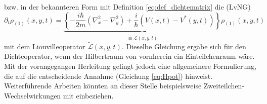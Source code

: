 bzw. in der bekannteren Form mit Definition \eqref{eq:def_dichtematrix} die \lvn (LvNG)
\begin{equation}
  \partial_t \rho_{(1)}(x,y,t) = \underbrace{\left\{-\frac{i\hbar}{2m}(\nabla_x^2 - \nabla_y^2) + \frac{i}{\hbar}(V(x,t) - V^*(y,t)) \right\}}_{\equiv{\tilde{\mathcal{L}}(x,y,t)}} \rho_{(1)}(x,y,t)
  \label{eq:lvn_first}
\end{equation}
mit dem Liouvilleoperator $\tilde{\mathcal{L}}(x,y,t)$. Dieselbe Gleichung ergäbe sich für den Dichteoperator, wenn der Hilbertraum von vornherein ein Einteilchenraum wäre. Mit der vorangegangen Herleitung gelingt jedoch eine allgemeinere Formulierung, die auf die entscheidende Annahme (Gleichung \eqref{eq:Hpot}) hinweist. Weiterführende Arbeiten könnten an dieser Stelle beispielsweise Zweiteilchen-Wechselwirkungen mit einbeziehen.

